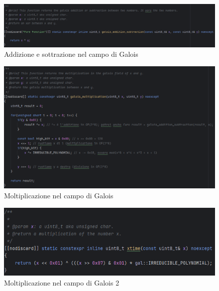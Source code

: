 \begin{figure}[H]
	\centering
	\includegraphics[width=1\textwidth, height=1\textheight, keepaspectratio]{./images/code/cpp/galois_math/galois_addition_subtraction.PNG}
	\caption{Addizione e sottrazione nel campo di Galois}
	\label{fig:galois_addition_subtraction}
\end{figure}

\textsf{\small } %

\begin{figure}[H]
	\centering
	\includegraphics[width=1\textwidth, height=1\textheight, keepaspectratio]{./images/code/cpp/galois_math/galois_multiplication.PNG}
	\caption{Moltiplicazione nel campo di Galois}
	\label{fig:galois_multiplication}
\end{figure}

\textsf{\small } %

\begin{figure}[H]
	\centering
	\includegraphics[width=1\textwidth, height=1\textheight, keepaspectratio]{./images/code/cpp/galois_math/xtime.PNG}
	\caption{Moltiplicazione nel campo di Galois 2}
	\label{fig:xtime}
\end{figure}

